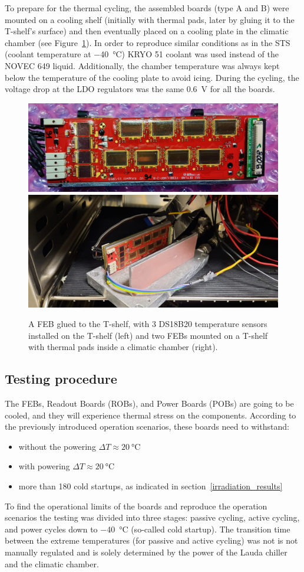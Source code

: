 To prepare for the thermal cycling, the assembled boards (type A and B) were mounted on a cooling shelf (initially with thermal pads, later by gluing it to the T-shelf’s surface) and then eventually placed on a cooling plate in the climatic chamber (see Figure~\ref{fig_cycling_temps}). In order to reproduce similar conditions as in the \gls{STS} (coolant temperature at \SI{-40}{\celsius}) KRYO 51 coolant was used instead of the NOVEC 649 liquid. Additionally, the chamber temperature was always kept below the temperature of the cooling plate to avoid icing. During the cycling, the voltage drop at the \gls{LDO} regulators was the same \SI{0.6}{\volt} for all the boards.

\begin{figure}[!h]
\centering
\includegraphics[width=0.5\columnwidth]{Chapter4/images/FEBB_T_sensors.jpeg}
\includegraphics[width=0.4\columnwidth]{Chapter4/images/thermal_setup.jpeg}
\caption{A \gls{FEB} glued to the T-shelf, with 3 DS18B20 temperature sensors installed on the T-shelf (left) and two \gls{FEB}s mounted on a T-shelf with thermal pads inside a climatic chamber (right).}
\label{fig_cycling_temps}
\end{figure}

\newpage

\subsection{Testing procedure}
The \glspl{FEB}, Readout Boards (\glspl{ROB}), and  Power Boards (\glspl{POB}) are going to be cooled, and they will experience thermal stress on the components. According to the previously introduced operation scenarios, these boards need to withstand:
\begin{itemize}
    \item without the powering $\Delta T\approx\SI{20}{\celsius} $
    \item with powering $\Delta T\approx\SI{20}{\celsius} $
    \item more than 180 cold startups, as indicated in section~\ref{irradiation_results}
\end{itemize}
To find the operational limits of the boards and reproduce the operation scenarios the testing was divided into three stages: passive cycling, active cycling, and power cycles down to \SI{-40}{\celsius} (so-called cold startup). The transition time between the extreme temperatures (for passive and active cycling) was not is not manually regulated and is solely determined by the power of the Lauda chiller and the climatic chamber.

